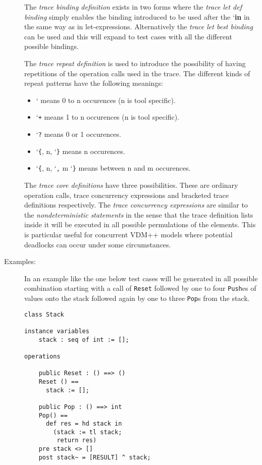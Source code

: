 \documentclass{overturerepchap}
\newcommand{\Lit}[1]{`{\tt #1}\Quote}
\newcommand{\Lop}[1]{`{\bf\ttfamily #1}\Quote}
\begin{document}
\begin{description}
The \emph{trace binding definition} exists in two forms where the
\emph{trace let def binding} simply enables the binding introduced to
be used after the \Lop{in} in the same way as in
let-expressions. Alternatively the \emph{trace let best binding} can
be used and this will expand to test cases with all the different
possible bindings.

The \emph{trace repeat definition} is used to introduce the
possibility of having repetitions of the operation calls used in the
trace. 
The different kinds of repeat patterns have the following meanings:
\begin{itemize}
\item  \Lit{*} means 0 to n occurences (n is tool specific). 
\item  \Lit{+} means 1 to n occurences (n is tool specific). 
\item  \Lit{?} means 0 or 1 occurences. 
\item  \Lit{\{}, n, \Lit{\}} means n occurences.
\item  \Lit{\{}, n, \Lit{,} m \Lit{\}} means between n and m occurences.
\end{itemize}

The \emph{trace core definitions} have three possibilities. These are
ordinary operation calls, trace concurrency expressions and bracketed
trace definitions respectively. 
The \emph{trace concurrency expressions} are similar to the
\emph{nondeterministic statements} in the sense that the trace
definition lists inside it will be executed in all possible
permulations of the elements. This is particular useful for concurrent
VDM++ models where potential deadlocks can occur under some
circumstances. 

\item[Examples:] In an example like the one below test cases will be
generated in all possible combination starting with a call
of \texttt{Reset} followed by one to four \texttt{Push}es of values
onto the stack followed again by one to three \texttt{Pop}s from the stack. \\
\begin{lstlisting}
class Stack

instance variables
    stack : seq of int := [];

operations

    public Reset : () ==> ()
    Reset () ==
      stack := [];

    public Pop : () ==> int
    Pop() ==
      def res = hd stack in
        (stack := tl stack;
         return res)
    pre stack <> []
    post stack~ = [RESULT] ^ stack;


\end{lstlisting}
\end{description}
\end{document}
